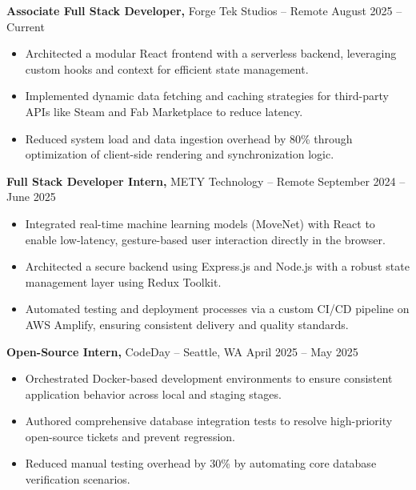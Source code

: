 \documentclass[11pt]{article}       %
\begin{document}
\textbf{Associate Full Stack Developer,} {Forge Tek Studios} -- Remote \hfill August 2025 -- Current \\
\vspace{-9pt}
\begin{itemize}
  \item Architected a modular React frontend with a serverless backend, leveraging custom hooks and context for efficient state management.
  \item Implemented dynamic data fetching and caching strategies for third-party APIs like Steam and Fab Marketplace to reduce latency.
  \item Reduced system load and data ingestion overhead by 80\% through optimization of client-side rendering and synchronization logic.
\end{itemize}

\textbf{Full Stack Developer Intern,} {METY Technology} -- Remote \hfill September 2024 -- June 2025 \\
\vspace{-9pt}
\begin{itemize}
  \item Integrated real-time machine learning models (MoveNet) with React to enable low-latency, gesture-based user interaction directly in the browser.
  \item Architected a secure backend using Express.js and Node.js with a robust state management layer using Redux Toolkit.
  \item Automated testing and deployment processes via a custom CI/CD pipeline on AWS Amplify, ensuring consistent delivery and quality standards.
\end{itemize}

\textbf{Open-Source Intern,} {CodeDay} -- Seattle, WA \hfill April 2025 -- May 2025 \\
\vspace{-9pt}
\begin{itemize}
  \item Orchestrated Docker-based development environments to ensure consistent application behavior across local and staging stages.
  \item Authored comprehensive database integration tests to resolve high-priority open-source tickets and prevent regression.
  \item Reduced manual testing overhead by 30\% by automating core database verification scenarios.
\end{itemize}
\end{document}
